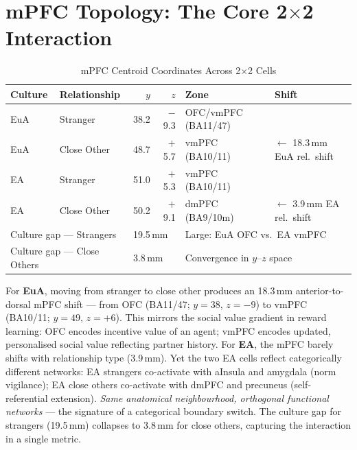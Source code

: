 \documentclass[11pt,a4paper]{report}
\begin{document}
\section*{mPFC Topology: The Core 2$\times$2 Interaction}

\begin{table}[ht]
\centering\small
\caption{mPFC Centroid Coordinates Across 2$\times$2 Cells}
\label{tab:mpfc}
\begin{tabular}{llrrll}
\toprule
\textbf{Culture} & \textbf{Relationship} & $y$ & $z$ & \textbf{Zone} & \textbf{Shift} \\
\midrule
\textcolor{euaBlue}{EuA} & Stranger    & 38.2 & $-$9.3 & OFC/vmPFC (BA11/47) & \\
\textcolor{euaBlue}{EuA} & Close Other & 48.7 & $+$5.7 & vmPFC (BA10/11)     & $\leftarrow$ 18.3\,mm EuA rel.\ shift \\
\textcolor{eaRed}{EA}    & Stranger    & 51.0 & $+$5.3 & vmPFC (BA10/11)     & \\
\textcolor{eaRed}{EA}    & Close Other & 50.2 & $+$9.1 & dmPFC (BA9/10m)     & $\leftarrow$ 3.9\,mm EA rel.\ shift \\
\midrule
\multicolumn{2}{l}{Culture gap --- Strangers}    & \multicolumn{2}{l}{19.5\,mm} & \multicolumn{2}{l}{Large: EuA OFC vs.\ EA vmPFC} \\
\multicolumn{2}{l}{Culture gap --- Close Others} & \multicolumn{2}{l}{3.8\,mm}  & \multicolumn{2}{l}{Convergence in $y$--$z$ space} \\
\bottomrule
\end{tabular}
\end{table}

For \textcolor{euaBlue}{\textbf{EuA}}, moving from stranger to close other produces an
18.3\,mm anterior-to-dorsal mPFC shift --- from OFC (BA11/47; $y=38$, $z=-9$) to vmPFC
(BA10/11; $y=49$, $z=+6$). This mirrors the social value gradient in reward learning: OFC
encodes incentive value of an agent; vmPFC encodes updated, personalised social value
reflecting partner history. For \textcolor{eaRed}{\textbf{EA}}, the mPFC barely shifts
with relationship type (3.9\,mm). Yet the two EA cells reflect categorically different
networks: EA strangers co-activate with aInsula and amygdala (norm vigilance); EA close
others co-activate with dmPFC and precuneus (self-referential extension). \emph{Same
anatomical neighbourhood, orthogonal functional networks} --- the signature of a categorical
boundary switch. The culture gap for strangers (19.5\,mm) collapses to 3.8\,mm for close
others, capturing the interaction in a single metric.
\end{document}
